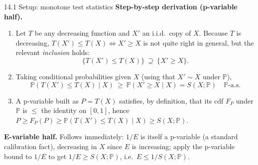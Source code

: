 \documentclass[aspectratio=169,10pt]{beamer}
\newcommand{\PP}{\mathbb{P}}
\begin{document}
\begin{frame}[allowframebreaks]{14.1 Setup: monotone test statistics}
  \textbf{Step-by-step derivation (p-variable half).}
  \begin{enumerate}
    \item Let $T$ be any decreasing function and $X'$ an i.i.d.\ copy of $X$.
      Because $T$ is decreasing, $T(X') \le T(X) \iff X' \geq X$ is not
      quite right in general, but the relevant \emph{inclusion} holds:
      \[
        \{T(X') \leq T(X)\} \ \supseteq\ \{X' \geq X\}.
      \]
    \item Taking conditional probabilities given $X$ (using that $X'\sim X$
      under $\PP$),
      \[
        \PP(T(X') \leq T(X) \mid X) \ \geq\ \PP(X' \geq X \mid X) = S(X;\PP)
        \quad \PP\text{-a.s.}
      \]
    \item A p-variable built as $P = T(X)$ satisfies, by definition, that
      its cdf $F_P$ under $\PP$ is $\leq$ the identity on $[0,1]$, hence
      $P \geq F_P(P) \geq \PP(T(X')\le T(X)\mid X) \geq S(X;\PP)$.
  \end{enumerate}
  \textbf{E-variable half.} Follows immediately: $1/E$ is itself a
  p-variable (a standard calibration fact), decreasing in $X$ since $E$ is
  increasing; apply the p-variable bound to $1/E$ to get $1/E \geq S(X;\PP)$,
  i.e.\ $E \leq 1/S(X;\PP)$.
\end{frame}
\end{document}
